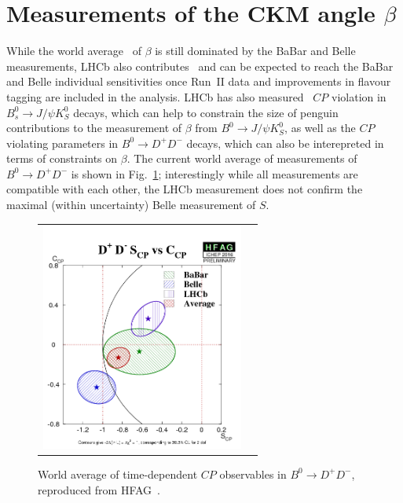 \section{Measurements of the CKM angle $\beta$}
\label{sec:beta}

While the world average~\cite{HFAG} of $\beta$ is still dominated
by the BaBar and Belle measurements, LHCb also contributes~\cite{} and can be expected
to reach the BaBar and Belle individual sensitivities once Run~II data and
improvements in flavour tagging are included in the analysis. LHCb has also measured~\cite{}
$CP$ violation in $B^0_s \to J/\psi K^0_S$ decays,
which can help to constrain the size of penguin contributions to the measurement
of $\beta$ from $B^0 \to J/\psi K^0_S$, as well as the $CP$ violating parameters in
$B^0 \to D^+ D^-$ decays, which can also be interepreted in terms of constraints on $\beta$.
The current world average of measurements of $B^0 \to D^+ D^-$ is shown in Fig.~\ref{b2ddwa}; 
interestingly while all measurements are compatible with each other, the LHCb measurement
does not confirm the maximal (within uncertainty) Belle measurement of $S$.

\begin{figure}
  \begin{center}
    \begin{tabular}{c c}
      \includegraphics[height=7.5cm]{figs/D+D-S_CPvsC_CP.png} &
    \end{tabular}
  \end{center}
  \vspace{-0.5cm}
  \caption{\label{b2ddwa}World average of time-dependent $CP$ observables in $B^0 \to D^+ D^-$, reproduced from HFAG~\cite{HFAG}.}
\end{figure}

